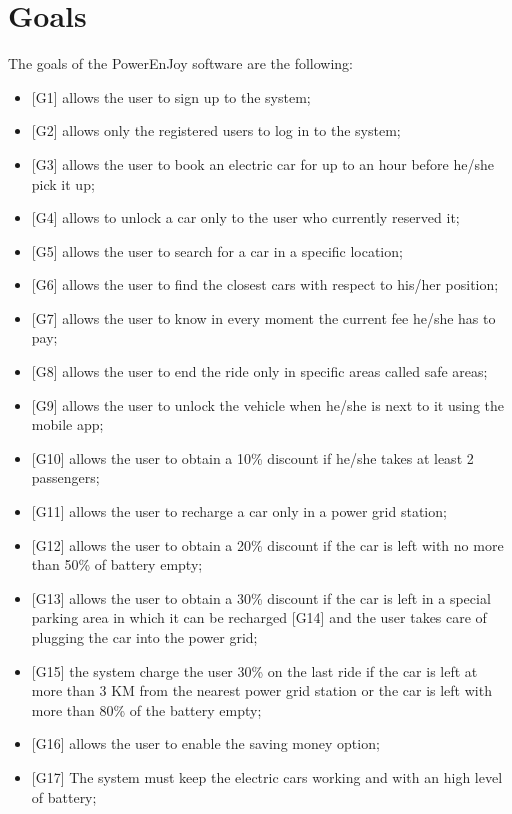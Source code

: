 \section{Goals}
The goals of the PowerEnJoy software are the following:
\begin{itemize}
    \item {[G1]} allows the user to sign up to the system;
    \item {[G2]} allows only the registered users to log in to the system;
	\item {[G3]} allows the user to book an electric car for up to an hour before he/she pick it up;
	\item {[G4]} allows to unlock a car only to the user who currently reserved it;
	\item {[G5]} allows the user to search for a car in a specific location; 
	\item {[G6]} allows the user to find the closest cars with respect to his/her position; 
	\item {[G7]} allows the user to know in every moment the current fee he/she has to pay;
	\item {[G8]} allows the user to end the ride only in specific areas called safe areas;
	\item {[G9]} allows the user to unlock the vehicle when he/she is next to it using the mobile app;
	\item {[G10]} allows the user to obtain a 10\% discount if he/she takes at least 2 passengers;
	\item {[G11]} allows the user to recharge a car only in a power grid station;
	\item {[G12]} allows the user to obtain a 20\% discount if the car is left with no more than 50\% of battery empty;
	\item {[G13]} allows the user to obtain a 30\% discount if the car is left in a special parking area in which it can be recharged {[G14]} and the user takes care of plugging the car into the power grid;
	\item {[G15]} the system charge the user 30\% on the last ride if the car is left at more than 3 KM from the nearest power grid station or the car is left with more than 80\% of the battery empty;
	\item {[G16]} allows the user to enable the saving money option;
	\item {[G17]} The system must keep the electric cars working and with an high level of battery;
	
	
\end{itemize}
